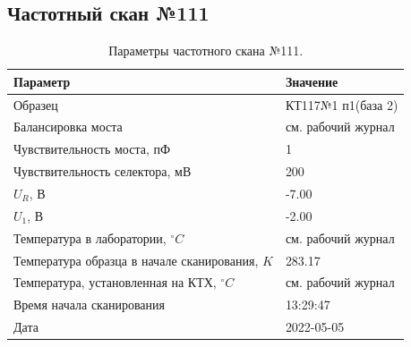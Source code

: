 \subsection{Частотный скан №111}
\begin{table}[!ht]
    \centering
    \caption{Параметры частотного скана №111.}
    \begin{tabular}{|l|l|}
        \hline
        Параметр                                       & Значение                  \\ \hline
        Образец                                        & КТ117№1 п1(база 2)        \\ \hline
        Балансировка моста                             & см. рабочий журнал        \\ \hline
        Чувствительность моста, пФ                     & 1                         \\ \hline
        Чувствительность селектора, мВ                 & 200                       \\ \hline
        $U_R$, В                                       & -7.00                     \\ \hline
        $U_1$, В                                       & -2.00                     \\ \hline
        Температура в лаборатории, $^\circ C$          & см. рабочий журнал        \\ \hline
        Температура образца в начале сканирования, $K$ & 283.17                    \\ \hline
        Температура, установленная на КТХ, $^\circ C$  & см. рабочий журнал        \\ \hline
        Время начала сканирования                      & 13:29:47                  \\ \hline
        Дата                                           & 2022-05-05                \\ \hline
    \end{tabular}
    \label{table:frequency_scan_111}
\end{table}

